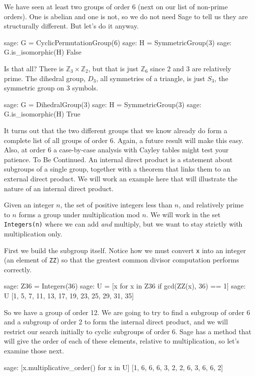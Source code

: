 %
We have seen at least two groups of order $6$ (next on our list of non-prime orders).  One is abelian and one is not, so we do not need Sage to tell us they are structurally different.  But let's do it anyway.
%
\begin{sageexample}
sage: G = CyclicPermutationGroup(6)
sage: H = SymmetricGroup(3)
sage: G.is_isomorphic(H)
False
\end{sageexample}
%
Is that all?  There is ${\mathbb Z}_3\times{\mathbb Z}_2$, but that is just ${\mathbb Z}_6$ since $2$ and $3$ are relatively prime.  The dihedral group, $D_3$, all symmetries of a triangle, is just $S_3$, the symmetric group on $3$ symbols.
%
\begin{sageexample}
sage: G = DihedralGroup(3)
sage: H = SymmetricGroup(3)
sage: G.is_isomorphic(H)
True
\end{sageexample}
%
It turns out that the two different groups that we know already do form a complete list of all groups of order $6$.  Again, a future result will make this easy.  Also, at order $6$ a case-by-case analysis with Cayley tables might test your patience.  To Be Continued.
%
%
An internal direct product is a statement about subgroups of a single group, together with a theorem that links them to an external direct product.  We will work an example here that will illustrate the nature of an internal direct product.\par
%
Given an integer $n$, the set of positive integers less than $n$, and relatively prime to $n$ forms a group under multiplication mod $n$.  We will work in the set \verb?Integers(n)? where we can add \emph{and} multiply, but we want to stay strictly with multiplication only.\par
%
First we build the subgroup itself.  Notice how we must convert \verb?x? into an integer (an element of \verb?ZZ?) so that the greatest common divisor computation performs correctly.
%
\begin{sageexample}
sage: Z36 = Integers(36)
sage: U = [x for x in Z36 if gcd(ZZ(x), 36) == 1]
sage: U
[1, 5, 7, 11, 13, 17, 19, 23, 25, 29, 31, 35]
\end{sageexample}
%
So we have a group of order 12.  We are going to try to find a subgroup of order 6 and a subgroup of order 2 to form the internal direct product, and we will restrict our search initially to cyclic subgroups of order 6.  Sage has a method that will give the order of each of these elements, relative to multiplication, so let's examine those next.
%
\begin{sageexample}
sage: [x.multiplicative_order() for x in U]
[1, 6, 6, 6, 3, 2, 2, 6, 3, 6, 6, 2]
\end{sageexample}
